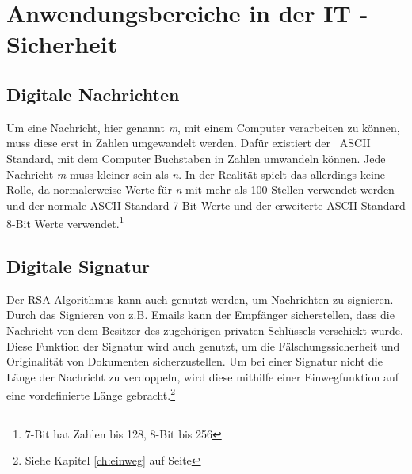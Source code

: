 \documentclass[12pt,a4paper]{scrartcl}
\begin{document}
\label{chap:primnumberselection}
\pagebreak

\section{Anwendungsbereiche in der IT - Sicherheit}
	\subsection{Digitale Nachrichten}
Um eine Nachricht, hier genannt \textit{m}, mit einem Computer verarbeiten zu können, muss diese erst in Zahlen umgewandelt werden. Dafür existiert der ~ASCII~ Standard, mit dem Computer Buchstaben in Zahlen umwandeln können. Jede Nachricht \textit{m} muss kleiner sein als \textit{n}. In der Realität spielt das allerdings keine Rolle, da normalerweise Werte für \textit{n} mit mehr als 100 Stellen verwendet werden und der normale ASCII Standard 7-Bit Werte und der erweiterte ASCII Standard 8-Bit Werte verwendet.\footnote{7-Bit hat Zahlen bis 128, 8-Bit bis 256}
	
	\subsection{Digitale Signatur}
	Der RSA-Algorithmus kann auch genutzt werden, um Nachrichten zu signieren. Durch das Signieren von z.B. Emails kann der Empfänger sicherstellen, dass die Nachricht von dem Besitzer des zugehörigen privaten Schlüssels verschickt wurde. Diese Funktion der Signatur wird auch genutzt, um die Fälschungssicherheit und Originalität von  Dokumenten sicherzustellen. Um bei einer Signatur nicht die Länge der Nachricht zu verdoppeln, wird diese mithilfe einer Einwegfunktion auf eine vordefinierte Länge gebracht.\footnote{Siehe Kapitel \ref{ch:einweg} auf Seite \pageref{ch:einweg}}\\
\end{document}
